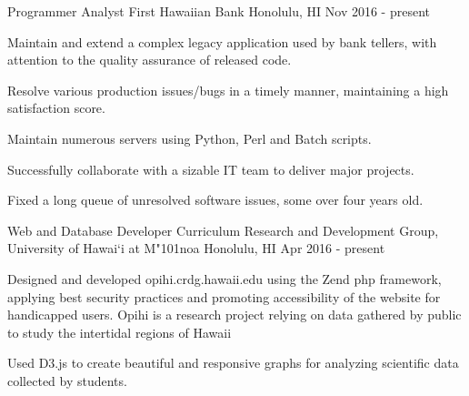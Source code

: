 \begin{cventries}
   	\cventry
    {Programmer Analyst}
    {First Hawaiian Bank}
    {Honolulu, HI}
    {Nov 2016 - present}
    {
        \begin{cvitems}
            \item {Maintain and extend a complex legacy application used by bank tellers, with attention to the quality assurance of released code.}
            \item {Resolve various production issues/bugs in a timely manner, maintaining a high satisfaction score.}
            \item {Maintain numerous servers using Python, Perl and Batch scripts.}
            \item {Successfully collaborate with a sizable IT team to deliver major projects.}
            \item {Fixed a long queue of unresolved software issues, some over four years old.}
        \end{cvitems}
    }

	\cventry
	{Web and Database Developer}
	{Curriculum Research and Development Group, University of Hawai`i at M{\char"101}noa}
	{Honolulu, HI}
	{Apr 2016 - present}
	{
		\begin{cvitems}
			\item {Designed and developed opihi.crdg.hawaii.edu using the Zend php framework, applying best security practices and promoting accessibility of the website for handicapped users. Opihi is a research project relying on data gathered by public to study the intertidal regions of Hawaii}
			\item {Used D3.js to create beautiful and responsive graphs for analyzing scientific data collected by students.}
		\end{cvitems}
	}



\end{cventries}
